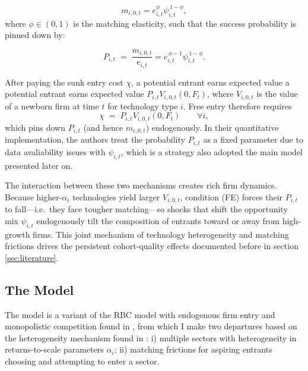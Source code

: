 \documentclass[a4paper,12pt]{article} %
\numberwithin{equation}{section} %
\numberwithin{figure}{section}
\numberwithin{table}{section}
\begin{document}
\[
m_{i,0,t}=e_{i,t}^{\phi}\psi_{i,t}^{\,1-\phi},
\]
where $\phi\in(0,1)$ is the matching elasticity, such that the success probability is pinned down by:

\[
P_{i,t}\;=\;\frac{m_{i,0,t}}{e_{i,t}}=e_{i,t}^{\,\phi-1}\psi_{i,t}^{\,1-\phi}.
\]

After paying the sunk entry cost $\chi$, a potential entrant earns expected value a potential entrant earns 
expected value $P_{i,t}V_{i,0,t}(0,F_t)$, where $V_{i,0,t}$ is the value of a newborn firm at time $t$ for technology type $i$.
Free entry therefore requires
\[
\chi \;=\;P_{i,t}V_{i,0,t}(0,F_t)\qquad\forall i,  \tag{FE}
\]
which pins down $P_{i,t}$ (and hence $m_{i,0,t}$) endogenously. In their quantitative implementation, the authors treat the 
probability $P_{i,t}$ as a fixed parameter due to data avaliability issues with $\psi_{i,t}$, which is a strategy also adopted
the main model presented later on.

The interaction between these two mechanisms creates rich firm dynamics. Because higher-$\alpha_i$ technologies yield 
larger $V_{i,0,t}$, condition (FE) forces their $P_{i,t}$ to fall—i.e.\ they face tougher matching—so shocks that 
shift the opportunity mix $\psi_{i,t}$ endogenously tilt the composition of entrants toward or away from high-growth firms. 
This joint mechanism of technology heterogeneity and matching frictions drives the persistent 
cohort‐quality effects documented before in section \ref{sec:literature}. 

\subsection{The Model}
\label{sec:model-mine}

The model is a variant of the RBC model with endogenous firm entry and monopolistic competition found in \textcite{bilbiie2012endogenous}, from which
I make two departures based on the heterogeneity mechanism found in \textcite{sedlavcek2017growth}: i) multiple sectors with heterogeneity in
returns-to-scale parameters $\alpha_i$; ii) matching frictions for aspiring entrants choosing and attempting to enter a sector.
\end{document}
